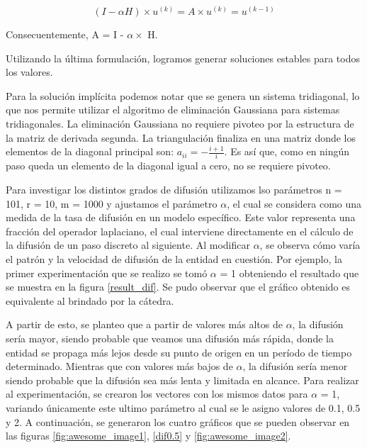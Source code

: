 \begin{equation}
(I - \alpha H) \times u^{(k)} = A \times u^{(k)} =  u^{(k-1)}
\end{equation}

Consecuentemente, A = I - $\alpha \times$ H.


Utilizando la última formulación, logramos generar soluciones estables para todos los valores.

Para la solución implícita podemos notar que se genera un sistema tridiagonal, lo que nos permite utilizar el algoritmo de eliminación Gaussiana para sistemas tridiagonales. La eliminación Gaussiana no requiere pivoteo por la estructura de la matriz de derivada segunda. La triangulación finaliza en una matriz donde los elementos de la diagonal principal son: $a_{ii} = - \frac{i+1}{i}$. 
Es así que, como en ningún paso queda un elemento de la diagonal igual a cero, no se requiere pivoteo.\par

Para investigar los distintos grados de difusión utilizamos lso parámetros n = 101, r = 10, m = 1000 y ajustamos el parámetro $\alpha$, el cual se considera como una medida de la tasa de difusión en un modelo específico. Este valor representa una fracción del operador laplaciano, el cual interviene directamente en el cálculo de la difusión de un paso discreto al siguiente.
Al modificar $\alpha$, se observa cómo varía el patrón y la velocidad de difusión de la entidad en cuestión. Por ejemplo, la primer experimentación que se realizo se tomó $\alpha$ = 1 obteniendo el resultado que se muestra en la figura \ref{result_dif}. Se pudo observar que el gráfico obtenido es equivalente al brindado por la cátedra.

A partir de esto, se planteo que a partir de valores más altos de $\alpha$, la difusión sería mayor, siendo probable que veamos una difusión más rápida, donde la entidad se propaga más lejos desde su punto de origen en un período de tiempo determinado.
Mientras que con valores más bajos de $\alpha$, la difusión sería menor siendo probable que la difusión sea más lenta y limitada en alcance.
Para realizar al experimentación, se crearon los vectores con los mismos datos para $\alpha$ = 1, variando únicamente este ultimo parámetro al cual se le asigno valores de 0.1, 0.5 y 2.
A continuación, se generaron los cuatro gráficos que se pueden observar en las figuras \ref{fig:awesome_image1}, \ref{dif0.5} y \ref{fig:awesome_image2}.

